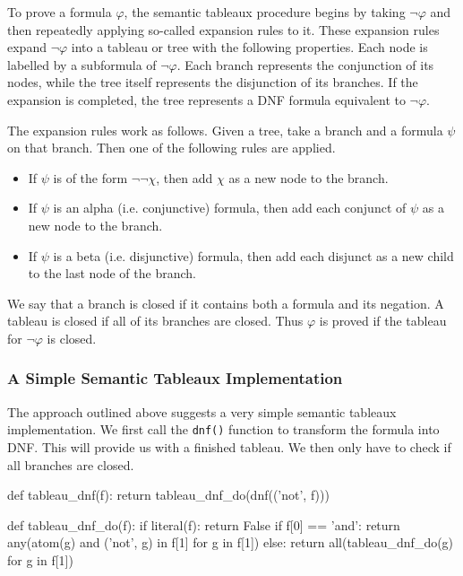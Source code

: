 \documentclass[a4paper,notitlepage]{scrartcl}
\let\phi\varphi
\begin{document}
To prove a formula $\phi$, the semantic tableaux procedure begins by taking
$\lnot\phi$ and then repeatedly applying so-called expansion rules to it. These
expansion rules expand $\lnot\phi$ into a tableau or tree with the following
properties. Each node is labelled by a subformula of $\lnot\phi$. Each branch
represents the conjunction of its nodes, while the tree itself represents the
disjunction of its branches. If the expansion is completed, the tree represents
a DNF formula equivalent to $\lnot\phi$.

The expansion rules work as follows. Given a tree, take a branch and a formula
$\psi$ on that branch. Then one of the following rules are applied.

\begin{itemize}
\item
If $\psi$ is of the form $\lnot\lnot\chi$, then add $\chi$ as a new node to the
branch.

\item
If $\psi$ is an alpha (i.e. conjunctive) formula, then add each conjunct of
$\psi$ as a new node to the branch.

\item
If $\psi$ is a beta (i.e. disjunctive) formula, then add each disjunct as a
new child to the last node of the branch.
\end{itemize}

We say that a branch is closed if it contains both a formula and its negation.
A tableau is closed if all of its branches are closed. Thus $\phi$ is proved if
the tableau for $\lnot\phi$ is closed.

\subsubsection{A Simple Semantic Tableaux Implementation}

The approach outlined above suggests a very simple semantic tableaux
implementation. We first call the \texttt{dnf()} function to transform the
formula into DNF. This will provide us with a finished tableau. We then only
have to check if all branches are closed.

\begin{code}
def tableau_dnf(f):
    return tableau_dnf_do(dnf(('not', f)))

def tableau_dnf_do(f):
    if literal(f):
        return False
    if f[0] == 'and':
        return any(atom(g) and ('not', g) in f[1] for g in f[1])
    else:
        return all(tableau_dnf_do(g) for g in f[1])
\end{code}
\end{document}
